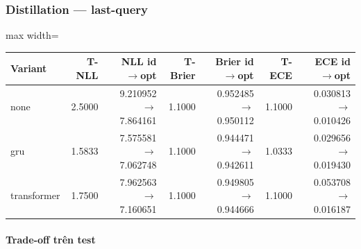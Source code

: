 \subsubsection*{Distillation --- last-query}

\begin{table}[!htbp]
\centering
\scriptsize
\setlength{\tabcolsep}{2.5pt}
\begin{adjustbox}{max width=\textwidth}
\begin{tabular}{@{}lrrrrrr@{}}
\toprule
Variant & T-NLL & NLL id$\rightarrow$opt & T-Brier & Brier id$\rightarrow$opt & T-ECE & ECE id$\rightarrow$opt \\
\midrule
none & 2.5000 & 9.210952$\rightarrow$7.864161 & 1.1000 & 0.952485$\rightarrow$0.950112 & 1.1000 & 0.030813$\rightarrow$0.010426 \\
gru & 1.5833 & 7.575581$\rightarrow$7.062748 & 1.1000 & 0.944471$\rightarrow$0.942611 & 1.0333 & 0.029656$\rightarrow$0.019430 \\
transformer & 1.7500 & 7.962563$\rightarrow$7.160651 & 1.1000 & 0.949805$\rightarrow$0.944666 & 1.1000 & 0.053708$\rightarrow$0.016187 \\
\bottomrule
\end{tabular}
\end{adjustbox}
\end{table}

\paragraph{Trade-off trên test}

